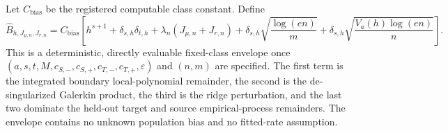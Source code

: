 Let \(C_{\mathrm{bias}}\) be the registered computable class constant.  Define
\[
 \widehat B_{h,J_{\mu,n},J_{r,n}}
 =C_{\mathrm{bias}}\left[
 h^{s+1}+\delta_{s,h}\delta_{t,h}
 +\lambda_n(J_{\mu,n}+J_{r,n})
 +\delta_{s,h}\sqrt{\frac{\log(en)}{m}}
 +\delta_{s,h}\sqrt{\frac{V_a(h)\log(en)}{n}}
 \right].
\]
This is a deterministic, directly evaluable fixed-class envelope once \((a,s,t,M,c_{S,-},c_{S,+},c_{T,-},c_{T,+},\varepsilon)\) and \((n,m)\) are specified.  The first term is the integrated boundary local-polynomial remainder, the second is the de-singularized Galerkin product, the third is the ridge perturbation, and the last two dominate the held-out target and source empirical-process remainders.  The envelope contains no unknown population bias and no fitted-rate assumption.